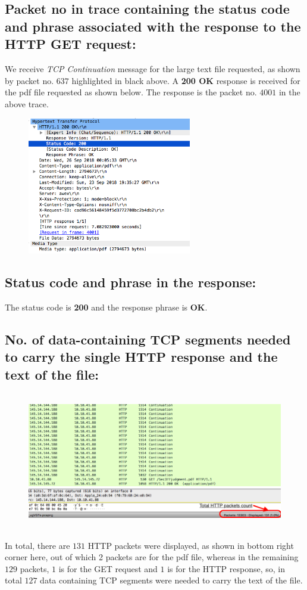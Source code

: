 \documentclass[]{report}
\begin{document}
\subsection{Packet no in trace containing the status code and phrase associated with the response to the HTTP GET request:}
We receive \textit{TCP Continuation} message for the large text file requested, as shown by packet no. $637$ highlighted in black above. A \textbf{200 OK} response is received for the pdf file requested as shown below. The response is the packet no. $4001$ in the above trace.
\begin{figure}[H]
	\vspace{0pt}
	\includegraphics[height = 170pt, keepaspectratio]{Snapshots/q3/3_3.png}
\end{figure}
\subsection{Status code and phrase in the response:}
The status code is \textbf{200} and the response phrase is \textbf{OK}.
\subsection{No. of data-containing TCP segments needed to carry the single HTTP response and the text of the file:}
\begin{figure}[H]
	\vspace{0pt}
	\includegraphics[height = 170pt, keepaspectratio]{Snapshots/q3/3_4.png}
\end{figure}
In total, there are $131$ HTTP packets were displayed, as shown in bottom right corner here, out of which 2 packets are for the pdf file, whereas in the remaining $129$ packets, $1$ is for the GET request and $1$ is for the HTTP response, so, in total $127$ data containing TCP segments were needed to carry the text of the file. 
\end{document}
